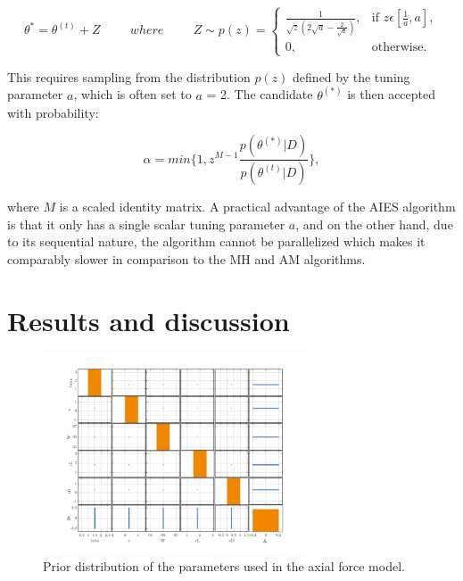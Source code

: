 \documentclass[11pt]{article}
\begin{document}
\begin{equation*}
    \theta^{*} = \theta^{(t)} + Z \hspace{1cm} where \hspace{1cm} Z \sim p(z) = \begin{cases}
    \frac{1}{\sqrt{z}(2\sqrt{a}-\frac{2}{\sqrt{a}})},& \text{if } z \epsilon [\frac{1}{a},a],\\
    0,              & \text{otherwise}.
\end{cases}
\end{equation*}

\noindent This requires sampling from the distribution $p(z)$ defined by the tuning parameter $a$, which is often set to $a$ = 2. The
candidate $\theta^{(*)}$ is then accepted with probability:


\begin{equation*}
        \alpha = min \bigg\{1, z^{M-1} \frac{p(\theta^{(*)}|D)}{p(\theta^{(t)}|D)}\bigg\},
    \end{equation*}

\noindent where $M$ is a scaled identity matrix. A practical advantage of the AIES algorithm is that it only has a single scalar tuning parameter $a$, and on the other hand, due to
its sequential nature, the algorithm cannot be parallelized which makes it comparably slower in comparison to the MH and AM algorithms.

\section{Results and discussion}
\begin{figure}
\centering
\includegraphics[width=0.7\textwidth]{prior.png}
\caption{Prior distribution of the parameters used in the axial force model.}
\label{prior}
\end{figure}
\end{document}
